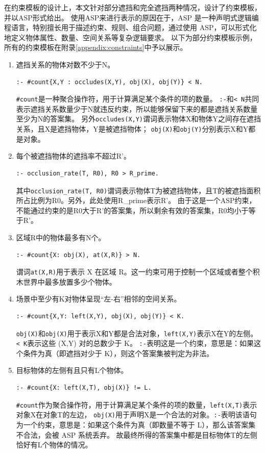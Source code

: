在约束模板的设计上，本文针对部分遮挡和完全遮挡两种情况，设计了约束模板，并以ASP形式给出。
使用ASP来进行表示的原因在于，ASP 是一种声明式逻辑编程语言，特别擅长用于描述约束、规则、组合问题，通过使用 ASP，可以形式化地定义物体属性、数量、空间关系等复杂逻辑要求。
以下为部分约束模板示例，所有的约束模板在附录\ref{appendix:constraints}中予以展示。
\begin{enumerate}[nosep]
\item 遮挡关系的物体对数不少于N。
\begin{lstlisting}
:- #count{X,Y : occludes(X,Y), obj(X), obj(Y)} < N.
\end{lstlisting}
\texttt{\#count}是一种聚合操作符，用于计算满足某个条件的项的数量。
\texttt{:-}和\texttt{< N}共同表示遮挡关系数量少于N就违反约束，所以能够保留下来的都是遮挡关系数量至少为N的答案集。
另外\texttt{occludes(X,Y)}谓词表示物体X和物体Y之间存在遮挡关系，且X是遮挡物体，Y是被遮挡物体；
\texttt{obj(X)}和\texttt{obj(Y)}分别表示X和Y都是对象。
\item 每个被遮挡物体的遮挡率不超过R'。
\begin{lstlisting}
:- occlusion_rate(T, R0), R0 > R_prime.
\end{lstlisting}
其中\texttt{occlusion\_rate(T, R0)}谓词表示物体T为被遮挡物体，且T的被遮挡面积所占比例为R0。另外，此处使用R\_prime表示R'。
由于这是一个ASP约束，不能通过约束的是R0大于R'的答案集，所以剩余有效的答案集，R0均小于等于R'。
\item 区域R中的物体最多有N个。
\begin{lstlisting}
:- #count{X: obj(X), at(X,R)} > N.
\end{lstlisting}
谓词\texttt{at(X,R)}用于表示 X 在区域 R。这一约束可用于控制一个区域或者整个积木世界中最多放置多少个物体。
\item 场景中至少有K对物体呈现“左-右”相邻的空间关系。
\begin{lstlisting}
:- #count{X,Y: left(X,Y), obj(X), obj(Y)} < K.
\end{lstlisting}
\texttt{obj(X)}和\texttt{obj(X)}用于表示X和Y都是合法对象，\texttt{left(X,Y)}表示X在Y的左侧。
\texttt{< K}表示这些 (X,Y) 对的总数少于 K。
\texttt{:-}表明这是一个约束，意思是：如果这个条件为真（即遮挡对少于 K），则这个答案集被判定为非法。
\item 目标物体的左侧有且只有L个物体。
\begin{lstlisting}
:- #count{X: left(X,T), obj(X)} != L.
\end{lstlisting}
\texttt{\#count}作为聚合操作符，用于计算满足某个条件的项的数量，\texttt{left(X,T)}表示对象X在对象T的左边，
\texttt{obj(X)}用于声明X是一个合法的对象。\texttt{:-}表明该语句为一个约束，意思是：如果这个条件为真（即数量不等于 L），那么该答案集 不合法，会被 ASP 系统丢弃。
故最终所得的答案集中都是目标物体T的左侧恰好有L个物体的情况。
\end{enumerate}
